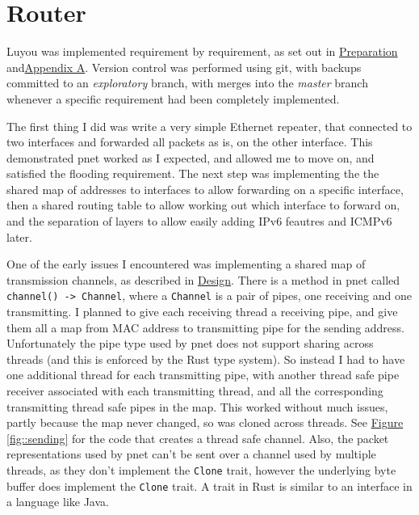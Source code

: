 \documentclass[12pt,a4paper,twoside,openright]{report}
\begin{document}
\section{Router}
\label{sec::router}

Luyou was implemented requirement by requirement, as set out in \hyperref[chap::preparation]{Preparation} and\hyperref[appendix::requirements]{Appendix A}.  Version control was performed using git, with backups committed to an \textit{exploratory} branch, with merges into the \textit{master} branch whenever a specific requirement had been completely implemented.

\bigskip

The first thing I did was write a very simple Ethernet repeater, that connected to two interfaces and forwarded all packets as is, on the other interface.  This demonstrated pnet\cite{pnet_rust} worked as I expected, and allowed me to move on, and satisfied the flooding requirement.  The next step was implementing the the shared map of addresses to interfaces to allow forwarding on a specific interface, then a shared routing table to allow working out which interface to forward on, and the separation of layers to allow easily adding IPv6 feautres and ICMPv6 later.

\bigskip

One of the early issues I encountered was implementing a shared map of transmission channels, as described in \hyperref[sec::design]{Design}. There is a method in pnet\cite{pnet_rust} called \verb!channel() -> Channel!, where a \verb!Channel! is a pair of pipes, one receiving and one transmitting.  I planned to give each receiving thread a receiving pipe, and give them all a map from MAC address to transmitting pipe for the sending address.  Unfortunately the pipe type used by pnet does not support sharing across threads (and this is enforced by the Rust type system). So instead I had to have one additional thread for each transmitting pipe, with another thread safe pipe receiver associated with each transmitting thread, and all the corresponding transmitting thread safe pipes in the map.  This worked without much issues, partly because the map never changed, so was cloned across threads.  See \hyperref[fig::sending]{Figure }\ref{fig::sending} for the code that creates a thread safe channel. Also, the packet representations used by pnet can't be sent over a channel used by multiple threads, as they don't implement the \verb!Clone! trait, however the underlying byte buffer does implement the \verb!Clone! trait. A trait in Rust is similar to an interface in a language like Java.
\end{document}
